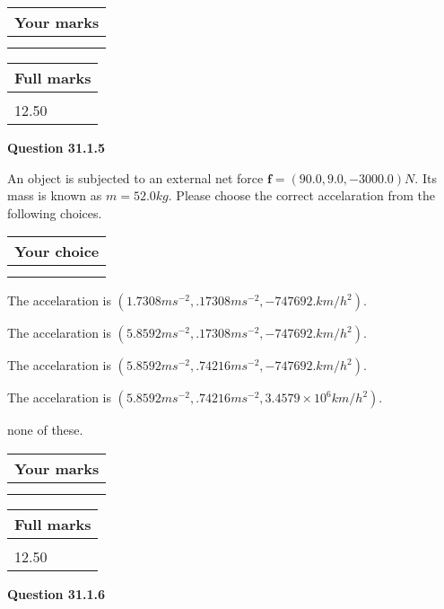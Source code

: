 \documentclass[12pt]{article}
\begin{document}
         \begin{tabular}{|l|}
\hline
 Your marks  \\
\hline
 \\ 
 \\ 
\hline
\end{tabular}
\hspace{0.05in} \begin{tabular}{|l|}
\hline
 Full marks  \\
\hline
 \\ 
12.50 \\
\hline
\end{tabular}
{\textbf{\Large{Question
31.1.5 
}}}
  
  
 
An object is subjected to an external net force $\mathbf{f}=(
90.0 ,
9.0,
-3000.0  )N$. Its mass is known as
$m= %
52.0  kg$. Please choose the correct accelaration
from the following choices.
 
  
  
\noindent\hspace{3.0in} \begin{tabular}{|l|}
\hline
Your choice \\
\hline
 \\ 
 \\ 
\hline
\end{tabular}
  
  
 
 
The accelaration is
$(
1.7308ms^{-2},
.17308ms^{-2},
-747692.km/h^2
).
$
 
 
The accelaration is
$(
5.8592ms^{-2},
.17308ms^{-2},
-747692.km/h^2
).
$
 
 
The accelaration is
$(
5.8592ms^{-2},
.74216ms^{-2},
-747692.km/h^2
).
$
 
 
The accelaration is
$(
5.8592ms^{-2},
.74216ms^{-2},
3.4579 \times 10^{6}km/h^2
).
$
 
 
none of these.
 
 
 
 

 
\vspace{0.3in}
  
\vspace{0.2in}
  
         \begin{tabular}{|l|}
\hline
 Your marks  \\
\hline
 \\ 
 \\ 
\hline
\end{tabular}
\hspace{0.05in} \begin{tabular}{|l|}
\hline
 Full marks  \\
\hline
 \\ 
12.50 \\
\hline
\end{tabular}
{\textbf{\Large{Question
31.1.6 
}}}
  
\end{document}
